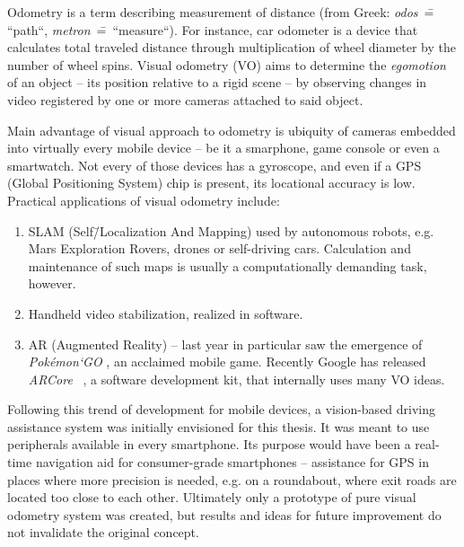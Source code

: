 Odometry is a term describing measurement of distance (from Greek: \textit{odos}~\==~ ``path``, \textit{metron}~\==~``measure``). For instance, car odometer is a device that calculates total traveled distance through multiplication of wheel diameter by the number of wheel spins. Visual odometry (VO) aims to determine the \textit{egomotion} of an object -- its position relative to a rigid scene -- by observing changes in video registered by one or more cameras attached to said object.


Main advantage of visual approach to odometry is ubiquity of cameras embedded into virtually every mobile device -- be it a smarphone, game console or even a smartwatch. Not every of those devices has a gyroscope, and even if a GPS (Global Positioning System) chip is present, its locational accuracy is low. Practical applications of visual odometry include:
\begin{enumerate}
	\itemsep0em
	\item SLAM (Self\=/Localization And Mapping) used by autonomous robots, e.g. Mars Exploration Rovers, drones or self-driving cars. Calculation and maintenance of such maps is usually a computationally demanding task, however.
	
	\item Handheld video stabilization, realized in software.
	
	\item AR (Augmented Reality) -- last year in particular saw the emergence of \textit{Pok\'emon`GO} \cite{pineco}, an acclaimed mobile game. Recently Google has released \textit{ARCore}~\cite{androidvr} , a software development kit, that internally uses many VO ideas.
\end{enumerate}


Following this trend of development for mobile devices, a vision-based driving assistance system was initially envisioned for this thesis. It was meant to use peripherals available in every smartphone. Its purpose would have been a real-time navigation aid for consumer-grade smartphones -- assistance for GPS in places where more precision is needed, e.g. on a roundabout, where exit roads are located too close to each other. Ultimately only a prototype of pure visual odometry system was created, but results and ideas for future improvement do not invalidate the original concept.

